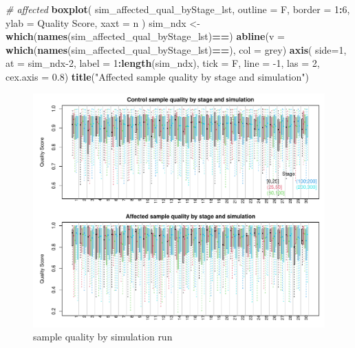 \documentclass[
]{book}
\newenvironment{Shaded}{\begin{snugshade}}{\end{snugshade}}
\newcommand{\CommentTok}[1]{\textcolor[rgb]{0.56,0.35,0.01}{\textit{#1}}}
\newcommand{\DataTypeTok}[1]{\textcolor[rgb]{0.13,0.29,0.53}{#1}}
\newcommand{\DecValTok}[1]{\textcolor[rgb]{0.00,0.00,0.81}{#1}}
\newcommand{\FloatTok}[1]{\textcolor[rgb]{0.00,0.00,0.81}{#1}}
\newcommand{\KeywordTok}[1]{\textcolor[rgb]{0.13,0.29,0.53}{\textbf{#1}}}
\newcommand{\NormalTok}[1]{#1}
\newcommand{\OperatorTok}[1]{\textcolor[rgb]{0.81,0.36,0.00}{\textbf{#1}}}
\newcommand{\StringTok}[1]{\textcolor[rgb]{0.31,0.60,0.02}{#1}}
\begin{document}
\begin{Shaded}
\begin{Highlighting}[]
\CommentTok{\# affected}
\KeywordTok{boxplot}\NormalTok{(}
\NormalTok{  sim\_affected\_qual\_byStage\_lst, }
  \DataTypeTok{outline =}\NormalTok{ F, }
  \DataTypeTok{border =} \DecValTok{1}\OperatorTok{:}\DecValTok{6}\NormalTok{,}
  \DataTypeTok{ylab =} \StringTok{\textquotesingle{}Quality Score\textquotesingle{}}\NormalTok{,}
  \DataTypeTok{xaxt =} \StringTok{\textquotesingle{}n\textquotesingle{}}
\NormalTok{)}
\NormalTok{sim\_ndx <{-}}\StringTok{ }\KeywordTok{which}\NormalTok{(}\KeywordTok{names}\NormalTok{(sim\_affected\_qual\_byStage\_lst)}\OperatorTok{==}\StringTok{\textquotesingle{}\textquotesingle{}}\NormalTok{)}
\KeywordTok{abline}\NormalTok{(}\DataTypeTok{v =} \KeywordTok{which}\NormalTok{(}\KeywordTok{names}\NormalTok{(sim\_affected\_qual\_byStage\_lst)}\OperatorTok{==}\StringTok{\textquotesingle{}\textquotesingle{}}\NormalTok{), }\DataTypeTok{col =} \StringTok{\textquotesingle{}grey\textquotesingle{}}\NormalTok{)}
\KeywordTok{axis}\NormalTok{(}
  \DataTypeTok{side=}\DecValTok{1}\NormalTok{, }
  \DataTypeTok{at =}\NormalTok{ sim\_ndx}\DecValTok{{-}2}\NormalTok{,        }
  \DataTypeTok{label =} \DecValTok{1}\OperatorTok{:}\KeywordTok{length}\NormalTok{(sim\_ndx),}
  \DataTypeTok{tick =}\NormalTok{ F, }
  \DataTypeTok{line =} \DecValTok{{-}1}\NormalTok{, }\DataTypeTok{las =} \DecValTok{2}\NormalTok{,}
  \DataTypeTok{cex.axis =} \FloatTok{0.8}\NormalTok{)}
\KeywordTok{title}\NormalTok{(}\StringTok{"Affected sample quality by stage and simulation"}\NormalTok{)}
\end{Highlighting}
\end{Shaded}

\begin{figure}
\centering
\includegraphics{Static/figures/look-sim-qual-1.pdf}
\caption{\label{fig:look-sim-qual}sample quality by simulation run}
\end{figure}
\end{document}
